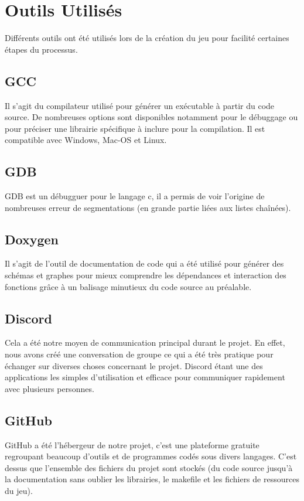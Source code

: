 \documentclass[a4paper,11pt]{article}
\begin{document}
\section {Outils Utilisés}
Différents outils ont été utilisés lors de la création du jeu pour facilité certaines étapes du processus.
\subsection{GCC}
Il s'agit du compilateur utilisé pour générer un exécutable à partir du code source. De nombreuses options sont disponibles notamment pour le débuggage ou pour préciser une librairie spécifique à inclure pour la compilation. Il est compatible avec Windows, Mac-OS et Linux.
\subsection{GDB}
GDB est un débugguer pour le langage c, il a permis de voir l'origine de nombreuses erreur de segmentations (en grande partie liées aux listes chaînées).\\
\subsection{Doxygen}
Il s'agit de l'outil de documentation de code qui a été utilisé pour générer des schémas et graphes pour mieux comprendre les dépendances et interaction des fonctions grâce à un balisage minutieux du code source au préalable. \\
\subsection{Discord}
Cela a été notre moyen de communication principal durant le projet. En effet, nous avons créé une conversation de groupe ce qui a été très pratique pour échanger sur diverses choses concernant le projet. Discord étant une des applications les simples d'utilisation et efficace pour communiquer rapidement avec plusieurs personnes.\\
\subsection{GitHub}
GitHub a été l'hébergeur de notre projet, c'est une plateforme gratuite regroupant beaucoup d'outils et de programmes codés sous divers langages. C'est dessus que l'ensemble des fichiers du projet sont stockés (du code source jusqu'à la documentation sans oublier les librairies, le makefile et les fichiers de ressources du jeu).\\
\end{document}
